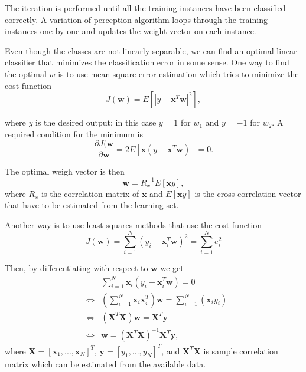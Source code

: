 The iteration is performed until all the training instances have been classified correctly. A variation of perception algorithm loops through the training instances one by one and updates the weight vector on each instance.

Even though the classes are not linearly separable, we can find an optimal linear classifier that minimizes the classification error in some sense. One way to find the optimal $w$ is to use mean square error estimation which tries to minimize the cost function
\begin{equation}
J(\mathbf{w}) = E[|y - \mathbf{x}^T \mathbf{w}|^2],
\end{equation}  

where $y$ is the desired output; in this case $y = 1$ for $w_1$ and $y = -1$ for $w_2$. \cite{gutierrez11} A required condition for the minimum is
\begin{equation}
\frac{\partial J(\mathbf{w}}{\partial \mathbf{w}} = 2 E[\mathbf{x}(y - \mathbf{x}^T \mathbf{w})] = 0.
\end{equation}

The optimal weigh vector is then
\begin{equation}
\mathbf{w} = R_x^{-1} E[\mathbf{x}y],
\end{equation}
where $R_x$ is the correlation matrix of $\mathbf{x}$ and $E[\mathbf{x}y]$ is the cross-correlation vector that have to be estimated from the learning set.

Another way is to use least squares methods that use the cost function
\begin{equation}
J(\mathbf{w}) = \sum_{i=1}^N (y_i - \mathbf{x}_i^T \mathbf{w})^2 = \sum_{i=1}^N e_i^2
\end{equation} 

Then, by differentiating with respect to $\mathbf{w}$ we get
\begin{eqnarray}
&& \sum_{i=1}^N \mathbf{x}_i (y_i - \mathbf{x}_i^T \mathbf{w}) = 0 \\
&\Leftrightarrow& (\sum_{i=1}^N \mathbf{x}_i \mathbf{x}_i^T) \mathbf{w} = \sum_{i=1}^N (\mathbf{x}_i y_i) \\
&\Leftrightarrow& (\mathbf{X}^T \mathbf{X}) \mathbf{w} = \mathbf{X}^T \mathbf{y} \\
&\Leftrightarrow& \mathbf{w} = (\mathbf{X}^T \mathbf{X})^{-1} \mathbf{X}^T \mathbf{y},
\end{eqnarray}
where $\mathbf{X} = [\mathbf{x}_1, ..., \mathbf{x}_N]^T$, $\mathbf{y} = [y_1, ..., y_N]^T$, and $\mathbf{X}^T \mathbf{X}$ is sample correlation matrix which can be estimated from the available data. \cite{gutierrez11}



